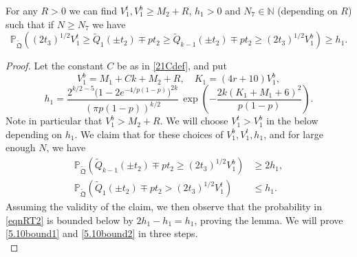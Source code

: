 \begin{lemma}\label{LemmaBP2} For any $R > 0$ we can find $V_1^t, V_1^b \geq M_2 + R$, $h_1 > 0$ and $N_7 \in \mathbb{N}$ (depending on $R$) such that if $N \geq N_7$ we have
	\begin{equation}\label{eqnRT2}
	\mathbb{P}_{\tilde{\mathfrak{Q}}} \left(  (2t_3)^{1/2} V_1^t \geq \tilde{Q}_1(\pm t_2) \mp p t_2 \geq \tilde{Q}_{k-1}(\pm t_2) \mp p t_2 \geq (2t_3)^{1/2} V_1^b  \right) \geq h_1.
	\end{equation}
	
\end{lemma}

\begin{proof}
	
	Let the constant $C$ be as in \eqref{21Cdef}, and put
	\begin{equation}\label{5.10Vb}
	V_1^b = M_1 + Ck + M_2 + R, \quad K_1 = (4r+10)V_1^b,
	\end{equation}
	\begin{equation}\label{5.10h1}
	h_1 =  \frac{2^{k/2-5}\big(1-2e^{-4/p(1-p)}\big)^{2k}}{(\pi p(1-p))^{k/2}}\,\exp\left(-\frac{2k(K_1+M_1+6)^2}{p(1-p)}\right).
	\end{equation}
	Note in particular that $V_1^b > M_2 + R$. We will choose $V_1^t > V_1^b$ in the below depending on $h_1$. We claim that for these choices of  $V_1^b, V_1^t, h_1$, and for large enough $N$, we have 
	\begin{align}
	\mathbb{P}_{\tilde{\mathfrak{Q}}}\left(\tilde{Q}_{k-1}(\pm t_2) \mp pt_2 \geq (2t_3)^{1/2}V_1^b\right) &\geq 2h_1, \label{5.10bound1}\\
	\mathbb{P}_{\tilde{\mathfrak{Q}}}\left(\tilde{Q}_1(\pm t_2) \mp pt_2 > (2t_3)^{1/2}V_1^t\right) &\leq h_1. \label{5.10bound2}
	\end{align}
	Assuming the validity of the claim, we then observe that the probability in \eqref{eqnRT2} is bounded below by $2h_1 - h_1 = h_1$, proving the lemma. We will prove \eqref{5.10bound1} and \eqref{5.10bound2} in three steps.\\
	

\end{proof}
